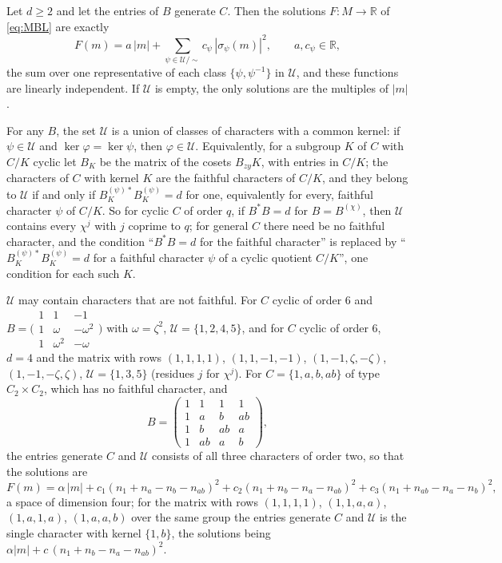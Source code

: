 \begin{corollary}\label{cor:multiset}
Let $d\ge2$ and let the entries of $B$ generate $C$. Then the solutions $F\colon M\to\mathbb{R}$ of \eqref{eq:MBL} are exactly
\[
F(m)=a\,|m|+\sum_{\psi\in \mathcal{U}/\sim}c_\psi\,|\sigma_\psi(m)|^2,\qquad a,c_\psi\in\mathbb{R},
\]
the sum over one representative of each class $\{\psi,\psi^{-1}\}$ in $\mathcal{U}$, and these functions are linearly independent. If $\mathcal{U}$ is empty, the only solutions are the multiples of $|m|$.

For any $B$, the set $\mathcal{U}$ is a union of classes of characters with a common kernel: if $\psi\in\mathcal{U}$ and $\ker\varphi=\ker\psi$, then $\varphi\in\mathcal{U}$. Equivalently, for a subgroup $K$ of $C$ with $C/K$ cyclic let $B_K$ be the matrix of the cosets $B_{zy}K$, with entries in $C/K$; the characters of $C$ with kernel $K$ are the faithful characters of $C/K$, and they belong to $\mathcal{U}$ if and only if $B_K^{(\psi)*}B_K^{(\psi)}=d$ for one, equivalently for every, faithful character $\psi$ of $C/K$. So for cyclic $C$ of order $q$, if $B^*B=d$ for $B=B^{(\chi)}$, then $\mathcal{U}$ contains every $\chi^j$ with $j$ coprime to $q$; for general $C$ there need be no faithful character, and the condition ``$B^*B=d$ for the faithful character'' is replaced by ``$B_K^{(\psi)*}B_K^{(\psi)}=d$ for a faithful character $\psi$ of a cyclic quotient $C/K$'', one condition for each such $K$.

$\mathcal{U}$ may contain characters that are not faithful. For $C$ cyclic of order $6$ and $B=\bigl(\begin{smallmatrix}1&1&-1\\1&\omega&-\omega^2\\1&\omega^2&-\omega\end{smallmatrix}\bigr)$ with $\omega=\zeta^2$, $\mathcal{U}=\{1,2,4,5\}$, and for $C$ cyclic of order $6$, $d=4$ and the matrix with rows $(1,1,1,1)$, $(1,1,-1,-1)$, $(1,-1,\zeta,-\zeta)$, $(1,-1,-\zeta,\zeta)$, $\mathcal{U}=\{1,3,5\}$ (residues $j$ for $\chi^j$). For $C=\{1,a,b,ab\}$ of type $C_2\times C_2$, which has no faithful character, and
\[
B=\begin{pmatrix}1&1&1&1\\1&a&b&ab\\1&b&ab&a\\1&ab&a&b\end{pmatrix},
\]
the entries generate $C$ and $\mathcal{U}$ consists of all three characters of order two, so that the solutions are
\[
F(m)=\alpha\,|m|+c_1(n_1+n_a-n_b-n_{ab})^2+c_2(n_1+n_b-n_a-n_{ab})^2+c_3(n_1+n_{ab}-n_a-n_b)^2 ,
\]
a space of dimension four; for the matrix with rows $(1,1,1,1)$, $(1,1,a,a)$, $(1,a,1,a)$, $(1,a,a,b)$ over the same group the entries generate $C$ and $\mathcal{U}$ is the single character with kernel $\{1,b\}$, the solutions being $\alpha|m|+c\,(n_1+n_b-n_a-n_{ab})^2$.
\end{corollary}

